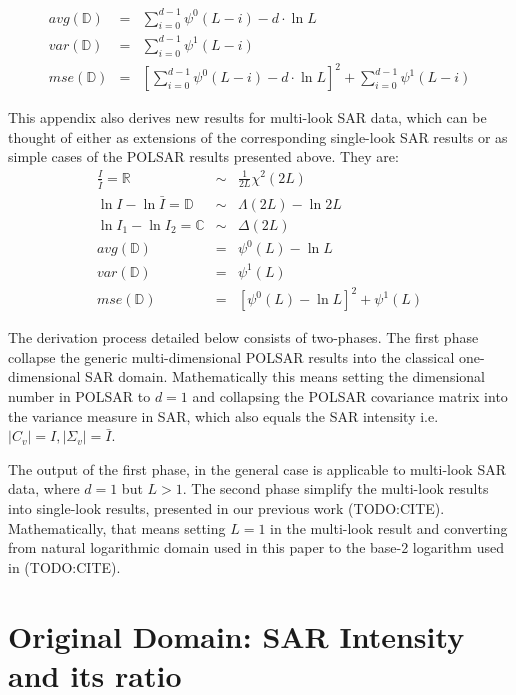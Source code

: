 \begin{eqnarray}
  avg(\mathbb{D}) &=& \sum^{d-1}_{i=0} \psi^0(L-i) - d \cdot \ln{L} \label{eqn:polsar_dispersion_averages} \\
  var(\mathbb{D}) &=& \sum^{d-1}_{i=0} \psi^1(L-i) \label{eqn:polsar_dispersion_variance} \\
  mse(\mathbb{D}) &=& \left[ \sum^{d-1}_{i=0} \psi^0(L-i) - d \cdot \ln{L} \right]^2 +  \sum^{d-1}_{i=0} \psi^1(L-i) \label{eqn:polsar_dispersion_mse}
\end{eqnarray}

This appendix also derives new results for multi-look SAR data,
  which can be thought of 
    either as extensions of the corresponding single-look SAR results
    or as simple cases of the POLSAR results presented above.
They are:
  \begin{eqnarray}
    \frac{I}{\bar{I}} = \mathbb{R} &\sim& \frac{1}{2L} \chi^2(2L) \\
    \ln{I} - \ln{\bar{I}} = \mathbb{D} &\sim& \Lambda(2L) - \ln{2L} \\
    \ln{I_1} - \ln{I_2} = \mathbb{C} &\sim& \Delta(2L) \\
    avg(\mathbb{D}) &=& \psi^0(L) - \ln{L} \\
    var(\mathbb{D}) &=& \psi^1(L) \\
    mse(\mathbb{D}) &=& \left[ \psi^0(L) - \ln{L} \right]^2 + \psi^1(L)
  \end{eqnarray}

The derivation process detailed below consists of two-phases.
The first phase collapse the generic multi-dimensional POLSAR results into the classical one-dimensional SAR domain.
Mathematically this means setting the dimensional number in POLSAR to  $d=1$
  and collapsing the POLSAR covariance matrix into the variance measure in SAR, which also equals the SAR intensity i.e. $|C_v|=I,|\Sigma_v|=\bar{I}$.

The output of the first phase, in the general case is applicable to multi-look SAR data, where $d=1$ but $L>1$.
The second phase simplify the multi-look results into single-look results, presented in our previous work (TODO:CITE).
Mathematically, that means setting $L=1$ in the multi-look result
  and converting from natural logarithmic domain used in this paper to the base-2 logarithm used in (TODO:CITE).

\section{Original Domain: SAR Intensity and its ratio}

